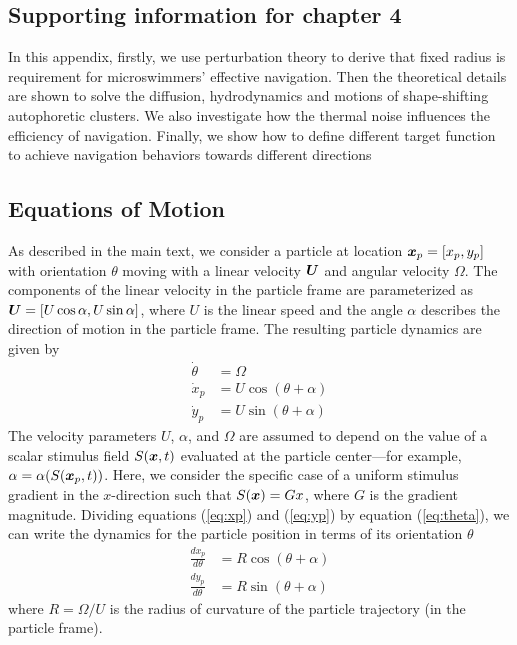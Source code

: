 \begin{appendices}



\chapter{Supporting information for chapter 4}
In this appendix, firstly, we use perturbation theory to derive that fixed radius is requirement for microswimmers' effective navigation. Then the theoretical details are shown to solve the diffusion, hydrodynamics and motions of shape-shifting autophoretic clusters. We also investigate how the thermal noise influences the efficiency of navigation. Finally, we show how to define different target function to achieve navigation behaviors towards different directions 

\section{Equations of Motion}

As described in the main text, we consider a particle at location $\boldsymbol{x}_p=[x_p,y_p]$ with orientation $\theta$ moving with a linear velocity $\boldsymbol{U}$ and angular velocity $\Omega$.  The components of the linear velocity in the particle frame are parameterized as $\boldsymbol{U}=[U \cos\alpha, U\sin \alpha]$, where $U$ is the linear speed and the angle $\alpha$ describes the direction of motion in the particle frame.  The resulting particle dynamics are given by
\begin{align}
    \dot{\theta} &= \Omega \label{eq:theta}
    \\ 
    \dot{x}_p &= U \cos(\theta + \alpha) \label{eq:xp} 
    \\ 
    \dot{y}_p &= U \sin(\theta + \alpha)\label{eq:yp}
\end{align}	
The velocity parameters $U$, $\alpha$, and $\Omega$ are assumed to depend on the value of a scalar stimulus field $S(\boldsymbol{x},t)$ evaluated at the particle center---for example, $\alpha=\alpha(S(\boldsymbol{x}_p,t))$. Here, we consider the specific case of a uniform stimulus gradient in the $x$-direction such that $S(\boldsymbol{x})= G x$, where $G$ is the gradient magnitude. Dividing equations (\ref{eq:xp}) and (\ref{eq:yp}) by equation (\ref{eq:theta}), we can write the dynamics for the particle position in terms of its orientation $\theta$ 
\begin{align}
    \frac{d x_p}{d\theta} &= R \cos(\theta + \alpha) \label{eq:xp2} 
    \\ 
    \frac{d y_p}{d\theta} &= R \sin(\theta + \alpha)\label{eq:yp2}
\end{align}	
where $R=\Omega/U$ is the radius of curvature of the particle trajectory (in the particle frame). 


\end{appendices}
